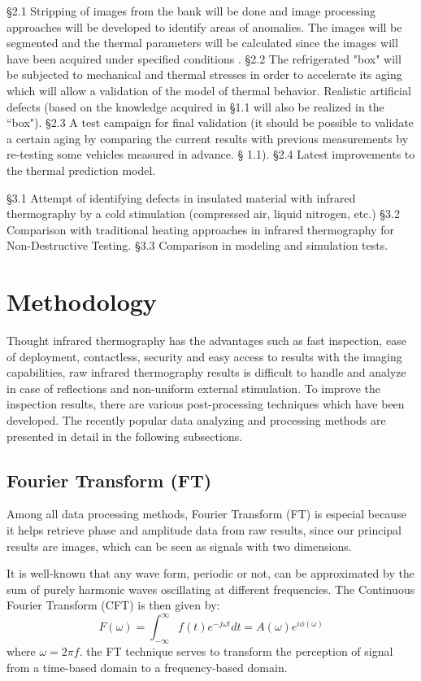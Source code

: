 \S 2.1 Stripping of images from the bank will be done and image processing approaches will be developed to identify areas of anomalies. The images will be segmented and the thermal parameters will be calculated since the images will have been acquired under specified conditions \citep{Ibarra-Castanedo2013}. §2.2 The refrigerated "box" will be subjected to mechanical and thermal stresses in order to accelerate its aging which will allow a validation of the model of thermal behavior. Realistic artificial defects (based on the knowledge acquired in §1.1 will also be realized in the ``box"). §2.3 A test campaign for final validation (it should be possible to validate a certain aging by comparing the current results with previous measurements by re-testing some vehicles measured in advance. § 1.1). §2.4 Latest improvements to the thermal prediction model.

\S 3.1 Attempt of identifying defects in insulated material with infrared thermography by a cold stimulation (compressed air, liquid nitrogen, etc.) \S 3.2 Comparison with traditional heating approaches in infrared thermography for Non-Destructive Testing. \S 3.3 Comparison in modeling and simulation tests.

\section{Methodology}
Thought infrared thermography has the advantages such as fast inspection, ease of deployment, contactless, security and easy access to results with the imaging capabilities, raw infrared thermography results is difficult to handle and analyze in case of reflections and non-uniform external stimulation. To improve the inspection results, there are various post-processing techniques which have been developed. The recently popular data analyzing and processing methods are presented in detail in the following subsections.
\subsection{Fourier Transform (FT)}
Among all data processing methods, Fourier Transform (FT) is especial because it helps retrieve phase and amplitude data from raw results, since our principal results are images, which can be seen as signals with two dimensions.

It is well-known that any wave form, periodic or not, can be approximated by the sum of purely harmonic waves oscillating at different frequencies. The Continuous Fourier Transform (CFT) is then given by:
\begin{equation}
F(\omega) = \int_{-\infty}^{\infty}f(t)e^{-j\omega t}dt = A(\omega)e^{i\phi(\omega)}
\end{equation}
where $\omega = 2 \pi f$. the FT technique serves to transform the perception of signal from a time-based domain to a frequency-based domain.

